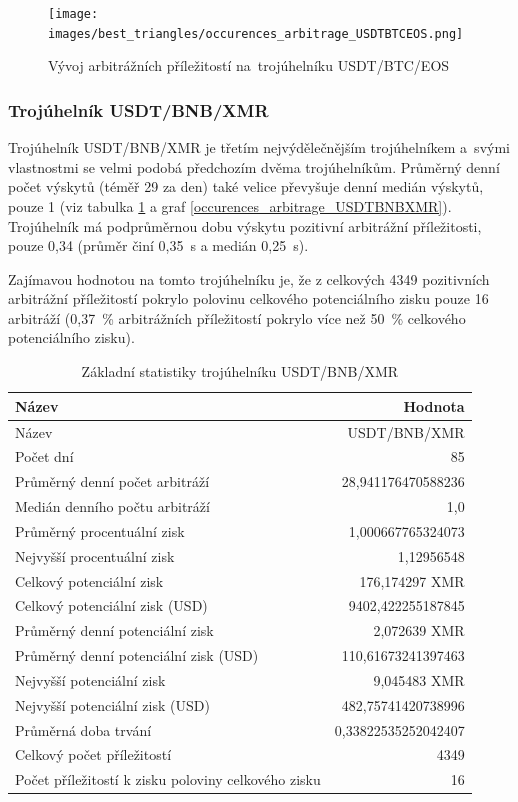 \documentclass[thesis=B,czech]{FITthesis}[2019/03/21]
\begin{document}
\begin{figure}\centering
	\texttt{[image: images/best\_triangles/occurences\_arbitrage\_USDTBTCEOS.png]}
	\caption{Vývoj arbitrážních příležitostí na~trojúhelníku USDT/BTC/EOS }\label{occurences_arbitrage_USDTBTCEOS}
\end{figure}

\subsubsection{Trojúhelník USDT/BNB/XMR}
Trojúhelník USDT/BNB/XMR je třetím nejvýdělečnějším trojúhelníkem \linebreak a~svými vlastnostmi se velmi podobá předchozím dvěma trojúhelníkům. Průměrný denní počet výskytů (téměř 29 za den) také velice převyšuje denní medián výskytů, pouze 1 (viz tabulka \ref{USDTBNBXMR_stats} a graf \ref{occurences_arbitrage_USDTBNBXMR}). Trojúhelník má \linebreak podprůměrnou dobu výskytu pozitivní arbitrážní příležitosti, pouze 0,34 (průměr činí 0,35~s a medián 0,25~s).

Zajímavou hodnotou na tomto trojúhelníku je, že z celkových 4349 pozitivních arbitrážní příležitostí pokrylo polovinu celkového potenciálního zisku pouze 16 arbitráží (0,37~\% arbitrážních příležitostí pokrylo více než 50~\% celkového potenciálního zisku).

\begin{table}\centering
\caption{Základní statistiky trojúhelníku USDT/BNB/XMR}
\label{USDTBNBXMR_stats}
\begin{tabular}{|| l | r ||}
\hline Název & Hodnota \\ 
\hline\hline Název & USDT/BNB/XMR \\ 
\hline Počet dní & 85 \\ 
\hline Průměrný denní počet arbitráží & 28,941176470588236 \\ 
\hline Medián denního počtu arbitráží & 1,0 \\ 
\hline Průměrný procentuální zisk & 1,000667765324073 \\ 
\hline Nejvyšší procentuální zisk & 1,12956548 \\ 
\hline Celkový potenciální zisk & 176,174297 XMR \\ 
\hline Celkový potenciální zisk (USD) & 9402,422255187845 \\ 
\hline Průměrný denní potenciální zisk & 2,072639 XMR \\ 
\hline Průměrný denní potenciální zisk (USD) & 110,61673241397463 \\ 
\hline Nejvyšší potenciální zisk & 9,045483 XMR \\ 
\hline Nejvyšší potenciální zisk (USD) & 482,75741420738996 \\ 
\hline Průměrná doba trvání & 0,33822535252042407 \\ 
\hline Celkový počet příležitostí & 4349 \\ 
\hline Počet příležitostí k zisku poloviny celkového zisku & 16 \\ 
\hline
\end{tabular}
\end{table}
\end{document}
